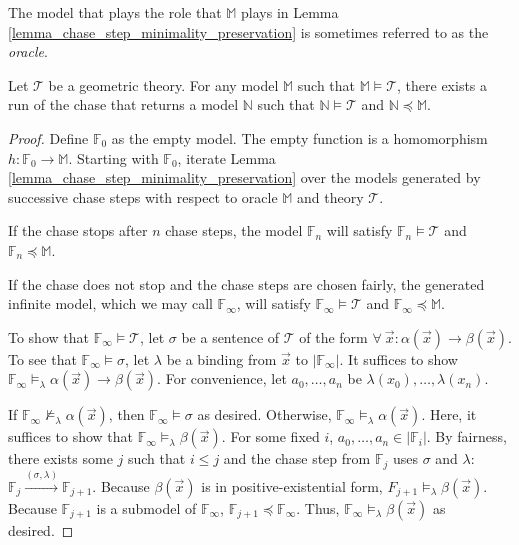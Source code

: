 		The model that plays the role that $\mathbb{M}$ plays in Lemma
		\ref{lemma_chase_step_minimality_preservation} is sometimes referred to
		as the \emph{oracle}.

		\begin{theorem}
			Let $\mathcal{T}$ be a geometric theory. For any model $\mathbb{M}$ such that
			$\mathbb{M} \models \mathcal{T}$, there exists a run of the chase that
			returns a model $\mathbb{N}$ such that $\mathbb{N} \models \mathcal{T}$ and
			$\mathbb{N} \preceq \mathbb{M}$.
		\end{theorem}

		\begin{proof}
			Define $\mathbb{F}_0$ as the empty model. The empty function is a
			homomorphism $h : \mathbb{F}_0 \to \mathbb{M}$. Starting with
			$\mathbb{F}_0$, iterate Lemma
			\ref{lemma_chase_step_minimality_preservation} over the models
			generated by successive chase steps with respect to oracle
			$\mathbb{M}$ and theory $\mathcal{T}$.

			If the chase stops after $n$ chase steps, the model $\mathbb{F}_n$
			will satisfy $\mathbb{F}_n \models \mathcal{T}$ and $\mathbb{F}_n
			\preceq \mathbb{M}$.

			If the chase does not stop and the chase steps are chosen fairly,
			the generated infinite model, which we may call
			$\mathbb{F}_\infty$, will satisfy $\mathbb{F}_\infty \models
			\mathcal{T}$ and $\mathbb{F}_\infty \preceq \mathbb{M}$.

			To show that $\mathbb{F}_\infty \models \mathcal{T}$, let $\sigma$
			be a sentence of $\mathcal{T}$ of the form $\forall\ \vec{x} :
			\alpha(\vec x) \to \beta(\vec x)$. To see that $\mathbb{F}_\infty
			\models \sigma$, let $\lambda$ be a binding from $\vec x$ to
			$|\mathbb{F}_\infty|$. It suffices to show $\mathbb{F}_\infty
			\models_\lambda \alpha(\vec x) \to \beta(\vec x)$. For convenience,
			let $a_0,\ldots,a_n$ be $\lambda(x_0),\ldots,\lambda(x_n)$.

			If $\mathbb{F}_\infty \not\models_\lambda \alpha(\vec x)$, then
			$\mathbb{F}_\infty \models \sigma$ as desired. Otherwise,
			$\mathbb{F}_\infty \models_\lambda \alpha(\vec x)$. Here, it
			suffices to show that $\mathbb{F}_\infty \models_\lambda \beta(\vec
			x)$. For some fixed $i$, $a_0,\ldots,a_n \in |\mathbb{F}_i|$. By
			fairness, there exists some $j$ such that $i \le j$ and the chase
			step from $\mathbb{F}_j$ uses $\sigma$ and $\lambda$: $\mathbb{F}_j
			\xrightarrow{(\sigma,\lambda)} \mathbb{F}_{j+1}$. Because
			$\beta(\vec x)$ is in positive-existential form, $F_{j+1}
			\models_\lambda \beta(\vec x)$. Because $\mathbb{F}_{j+1}$ is a
			submodel of $\mathbb{F}_\infty$, $\mathbb{F}_{j+1} \preceq
			\mathbb{F}_\infty$. Thus, $\mathbb{F}_\infty \models_\lambda
			\beta(\vec x)$ as desired.
		\end{proof}

